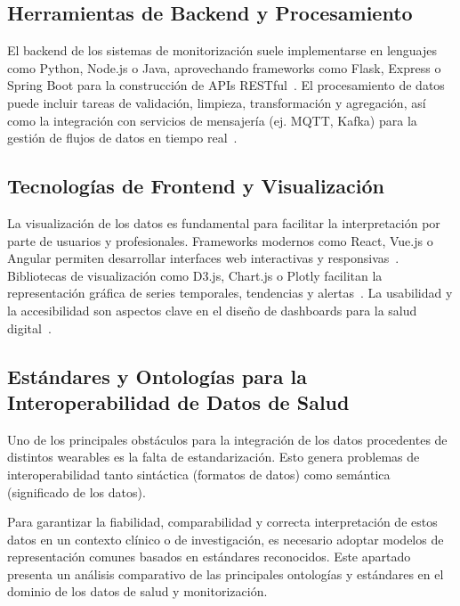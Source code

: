 \subsection{Herramientas de Backend y Procesamiento}

El backend de los sistemas de monitorización suele implementarse en lenguajes como Python, Node.js o Java, aprovechando frameworks como Flask, Express o Spring Boot para la construcción de APIs RESTful~\cite{Flask, Express, SpringBoot}. El procesamiento de datos puede incluir tareas de validación, limpieza, transformación y agregación, así como la integración con servicios de mensajería (ej. MQTT, Kafka) para la gestión de flujos de datos en tiempo real~\cite{Kafka, MQTT}.

\subsection{Tecnologías de Frontend y Visualización}

La visualización de los datos es fundamental para facilitar la interpretación por parte de usuarios y profesionales. Frameworks modernos como React, Vue.js o Angular permiten desarrollar interfaces web interactivas y responsivas~\cite{React, Vue, Angular}. Bibliotecas de visualización como D3.js, Chart.js o Plotly facilitan la representación gráfica de series temporales, tendencias y alertas~\cite{D3, Plotly}. La usabilidad y la accesibilidad son aspectos clave en el diseño de dashboards para la salud digital~\cite{Zhou2019}.

\subsection{Estándares y Ontologías para la Interoperabilidad de Datos de Salud}
Uno de los principales obstáculos para la integración de los datos procedentes de distintos wearables es la falta de estandarización. Esto genera problemas de interoperabilidad tanto sintáctica (formatos de datos) como semántica (significado de los datos).

Para garantizar la fiabilidad, comparabilidad y correcta interpretación de estos datos en un contexto clínico o de investigación, es necesario adoptar modelos de representación comunes basados en estándares reconocidos. Este apartado presenta un análisis comparativo de las principales ontologías y estándares en el dominio de los datos de salud y monitorización. 

